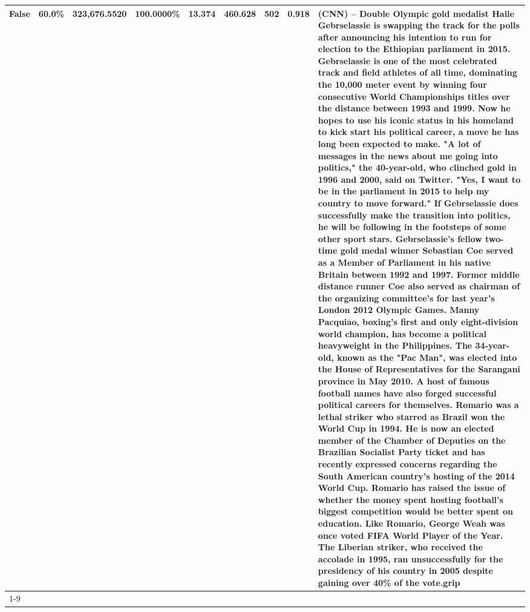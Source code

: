\begin{table}[H]
{\begin{tabular}{lllrlllll}
False & 60.0\% & 323,676.5520 & \bfseries \color{red} 100.0000\% & 13.374 & 460.628 & 502 & 0.918 & (CNN) -- Double Olympic gold medalist Haile Gebrselassie is swapping the track for the polls after announcing his intention to run for election to the Ethiopian parliament in 2015. Gebrselassie is one of the most celebrated track and field athletes of all time, dominating the 10,000 meter event by winning four consecutive World Championships titles over the distance between 1993 and 1999. Now he hopes to use his iconic status in his homeland to kick start his political career, a move he has long been expected to make. "A lot of messages in the news about me going into politics," the 40-year-old, who clinched gold in 1996 and 2000, said on Twitter. "Yes, I want to be in the parliament in 2015 to help my country to move forward." If Gebrselassie does successfully make the transition into politics, he will be following in the footsteps of some other sport stars. Gebrselassie's fellow two-time gold medal winner Sebastian Coe served as a Member of Parliament in his native Britain between 1992 and 1997. Former middle distance runner Coe also served as chairman of the organizing committee's for last year's London 2012 Olympic Games. Manny Pacquiao, boxing's first and only eight-division world champion, has become a political heavyweight in the Philippines. The 34-year-old, known as the "Pac Man", was elected into the House of Representatives for the Sarangani province in May 2010. A host of famous football names have also forged successful political careers for themselves. Romario was a lethal striker who starred as Brazil won the World Cup in 1994. He is now an elected member of the Chamber of Deputies on the Brazilian Socialist Party ticket and has recently expressed concerns regarding the South American country's hosting of the 2014 World Cup. Romario has raised the issue of whether the money spent hosting football's biggest competition would be better spent on education. Like Romario, George Weah was once voted FIFA World Player of the Year. The Liberian striker, who received the accolade in 1995, ran unsuccessfully for the presidency of his country in 2005 despite gaining over 40\% of the vote.grip \\
\cline{1-9}

\end{tabular}}
\end{table}
